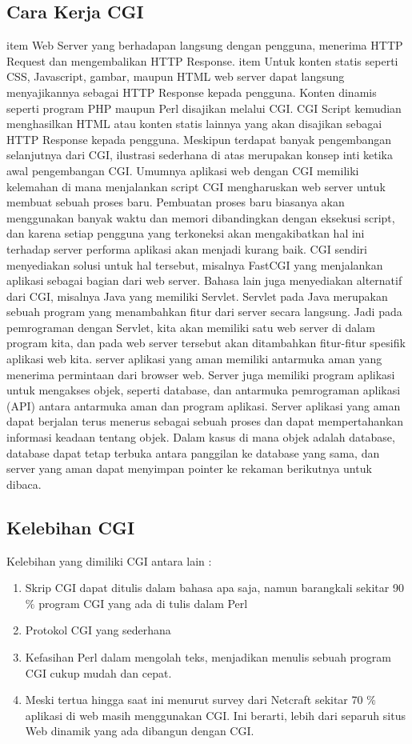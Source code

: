 \begin{enumerate}
\subsection{Cara Kerja CGI}
item Web Server yang berhadapan langsung dengan pengguna, menerima HTTP Request dan mengembalikan HTTP Response. 
item Untuk konten statis seperti CSS, Javascript, gambar, maupun HTML web server dapat langsung menyajikannya sebagai HTTP Response kepada pengguna. Konten dinamis seperti program PHP maupun Perl disajikan melalui CGI. CGI Script kemudian menghasilkan HTML atau konten statis lainnya yang akan disajikan sebagai HTTP Response kepada pengguna.
Meskipun terdapat banyak pengembangan selanjutnya dari CGI, ilustrasi sederhana di atas merupakan konsep inti ketika awal pengembangan CGI. Umumnya aplikasi web dengan CGI memiliki kelemahan di mana menjalankan script CGI mengharuskan web server untuk membuat sebuah proses baru. Pembuatan proses baru biasanya akan menggunakan banyak waktu dan memori dibandingkan dengan eksekusi script, dan karena setiap pengguna yang terkoneksi akan mengakibatkan hal ini terhadap server performa aplikasi akan menjadi kurang baik. 
CGI sendiri menyediakan solusi untuk hal tersebut, misalnya FastCGI yang menjalankan aplikasi sebagai bagian dari web server. Bahasa lain juga menyediakan alternatif dari CGI, misalnya Java yang memiliki Servlet. Servlet pada Java merupakan sebuah program yang menambahkan fitur dari server secara langsung. Jadi pada pemrograman dengan Servlet, kita akan memiliki satu web server di dalam program kita, dan pada web server tersebut akan ditambahkan fitur-fitur spesifik aplikasi web kita.
server aplikasi yang aman memiliki antarmuka aman yang menerima permintaan dari browser web. Server juga memiliki program aplikasi untuk mengakses objek, seperti database, dan antarmuka pemrograman aplikasi (API) antara antarmuka aman dan program aplikasi. 
Server aplikasi yang aman dapat berjalan terus menerus sebagai sebuah proses dan dapat mempertahankan informasi keadaan tentang objek. Dalam kasus di mana objek adalah database, database dapat tetap terbuka antara panggilan ke database yang sama, dan server yang aman dapat menyimpan pointer ke rekaman berikutnya untuk dibaca.
\subsection{Kelebihan CGI} 
Kelebihan yang dimiliki CGI antara lain :
\begin{enumerate}
	\item Skrip CGI dapat ditulis dalam bahasa apa saja, namun barangkali sekitar 90 $  \%  $ program CGI yang ada di tulis dalam Perl 
	\item Protokol CGI yang sederhana
	\item Kefasihan Perl dalam mengolah teks, menjadikan menulis sebuah program CGI cukup mudah dan cepat.
	\item Meski tertua hingga saat ini menurut survey dari Netcraft sekitar 70 $  \%  $ aplikasi di web masih menggunakan CGI. Ini berarti, lebih dari separuh situs Web dinamik yang ada dibangun dengan CGI.
\end{enumerate}


\end{enumerate}
